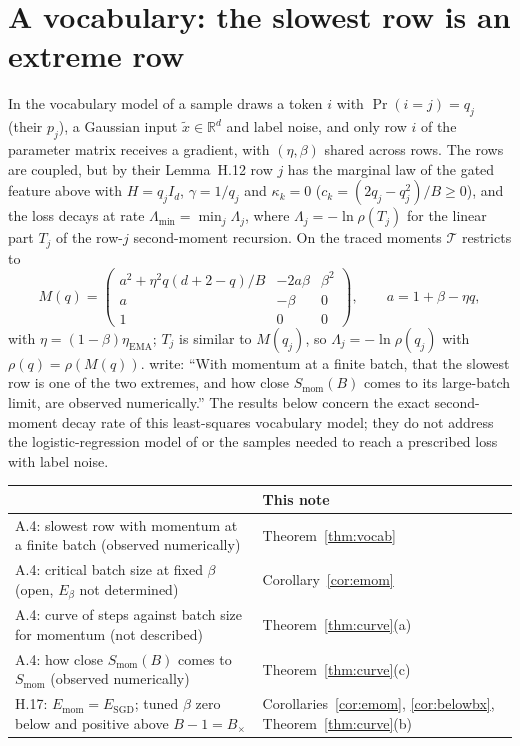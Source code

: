 \documentclass[11pt]{article}
\newcommand{\R}{\mathbb{R}}
\newcommand{\T}{\mathcal T}
\begin{document}
\section{A vocabulary: the slowest row is an extreme row}

In the vocabulary model of \citet[Section~H.3]{everett2026sparse} a sample draws a token $i$ with $\Pr(i=j)=q_j$ (their $p_j$), a Gaussian input $\tilde x\in\R^d$ and label noise, and only row $i$ of the parameter matrix receives a gradient, with $(\eta,\beta)$ shared across rows. The rows are coupled, but by their Lemma~H.12 row $j$ has the marginal law of the gated feature above with $H=q_jI_d$, $\gamma=1/q_j$ and $\kappa_k=0$ ($c_k=(2q_j-q_j^2)/B\ge0$), and the loss decays at rate $\Lambda_{\min}=\min_j\Lambda_j$, where $\Lambda_j=-\ln\rho(T_j)$ for the linear part $T_j$ of the row-$j$ second-moment recursion. On the traced moments $\T$ restricts to
\[
M(q)=\begin{pmatrix}a^2+\eta^2q(d+2-q)/B&-2a\beta&\beta^2\\ a&-\beta&0\\ 1&0&0\end{pmatrix},\qquad a=1+\beta-\eta q ,
\]
with $\eta=(1-\beta)\eta_{\mathrm{EMA}}$; $T_j$ is similar to $M(q_j)$, so $\Lambda_j=-\ln\rho(q_j)$ with $\rho(q)=\rho(M(q))$. \citet[Appendix~A.4]{everett2026sparse} write: ``With momentum at a finite batch, that the slowest row is one of the two extremes, and how close $S_{\mathrm{mom}}(B)$ comes to its large-batch limit, are observed numerically.'' The results below concern the exact second-moment decay rate of this least-squares vocabulary model; they do not address the logistic-regression model of \citet{everett2026sparse} or the samples needed to reach a prescribed loss with label noise.
\begin{center}\small
\begin{tabular}{@{}l@{\quad}l@{}}
\citet{everett2026sparse} & This note\\\hline
A.4: slowest row with momentum at a finite batch (observed numerically) & Theorem~\ref{thm:vocab}\\
A.4: critical batch size at fixed $\beta$ (open, $E_\beta$ not determined) & Corollary~\ref{cor:emom}\\
A.4: curve of steps against batch size for momentum (not described) & Theorem~\ref{thm:curve}(a)\\
A.4: how close $S_{\mathrm{mom}}(B)$ comes to $S_{\mathrm{mom}}$ (observed numerically) & Theorem~\ref{thm:curve}(c)\\
H.17: $E_{\mathrm{mom}}=E_{\mathrm{SGD}}$; tuned $\beta$ zero below and positive above $B-1=B_\times$ & Corollaries~\ref{cor:emom}, \ref{cor:belowbx}, Theorem~\ref{thm:curve}(b)
\end{tabular}
\end{center}
\end{document}
